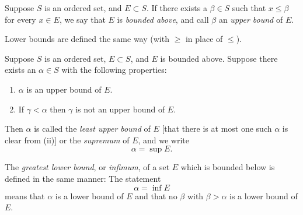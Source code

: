 Suppose $S$ is an ordered set, and $E \subset S$. If there exists a
$\beta \in S$ such that $x \le \beta$ for every $x \in E$, we say that $E$ is
\emph{bounded above}, and call $\beta$ an \emph{upper bound} of $E$.

Lower bounds are defined the same way (with $\ge$ in place of $\le$).

Suppose $S$ is an ordered set, $E \subset S$, and $E$ is bounded above. Suppose
there exists an $\alpha \in S$ with the following properties:
\begin{enumerate}[label=(\roman*), leftmargin=2.2em, itemsep=2pt, topsep=4pt]
  \item $\alpha$ is an upper bound of $E$.
  \item If $\gamma < \alpha$ then $\gamma$ is not an upper bound of
        $E$.
\end{enumerate}
Then $\alpha$ is called the \emph{least upper bound} of $E$ [that there is at
most one such $\alpha$ is clear from (ii)] or the \emph{supremum} of $E$, and we
write
\[ \alpha = \sup E. \]

The \emph{greatest lower bound}, or \emph{infimum}, of a set $E$ which is
bounded below is defined in the same manner: The statement
\[ \alpha = \inf E \]
means that $\alpha$ is a lower bound of $E$ and that no $\beta$ with
$\beta > \alpha$ is a lower bound of $E$.

